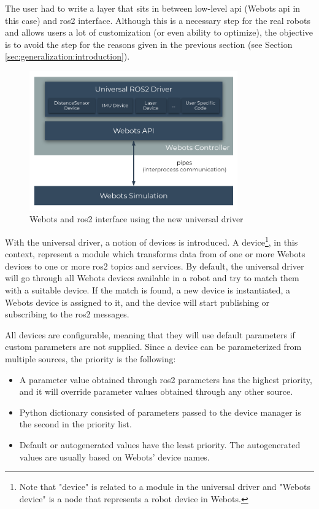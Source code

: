 The user had to write a layer that sits in between low-level \ac{api} (Webots \ac{api} in this case) and \ac{ros2} interface. 
Although this is a necessary step for the real robots and allows users a lot of customization (or even ability to optimize), the objective is to avoid the step for the reasons given in the previous section (see Section \ref{sec:generalization:introduction}).

\begin{figure}[H]
    \centering
    \includegraphics[width=0.8\textwidth]{generalization/figures/universal_driver_within_webots.pdf}
    \caption{Webots and \ac{ros2} interface using the new universal driver}
    \label{fig:generalization:universal_driver_within_webots}
\end{figure}

With the universal driver, a notion of devices is introduced.
A device\footnote{Note that "device" is related to a module in the universal driver and "Webots device" is a node that represents a robot device in Webots.}, in this context, represent a module which transforms data from of one or more Webots devices to one or more \ac{ros2} topics and services.
By default, the universal driver will go through all Webots devices available in a robot and try to match them with a suitable device.
If the match is found, a new device is instantiated, a Webots device is assigned to it, and the device will start publishing or subscribing to the \ac{ros2} messages.

All devices are configurable, meaning that they will use default parameters if custom parameters are not supplied.
Since a device can be parameterized from multiple sources, the priority is the following:
\begin{itemize}
    \item A parameter value obtained through \ac{ros2} parameters has the highest priority, and it will override parameter values obtained through any other source.
    \item Python dictionary consisted of parameters passed to the device manager is the second in the priority list.
    \item Default or autogenerated values have the least priority. The autogenerated values are usually based on Webots' device names.
\end{itemize}

